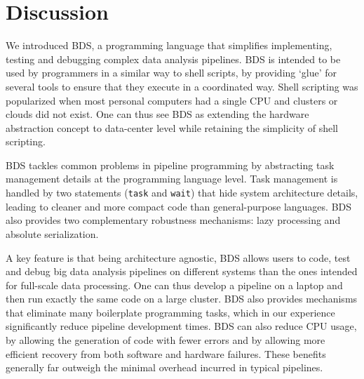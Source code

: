 \section{Discussion}

We introduced BDS, a programming language that simplifies implementing, testing and debugging complex data analysis pipelines. BDS is intended to be used by programmers in a similar way to shell scripts, by providing ‘glue’ for several tools to ensure that they execute in a coordinated way. Shell scripting was popularized when most personal computers had a single CPU and clusters or clouds did not exist. One can thus see BDS as extending the hardware abstraction concept to data-center level while retaining the simplicity of shell scripting.

BDS tackles common problems in pipeline programming by abstracting task management details at the programming language level. Task management is handled by two statements (\texttt{task} and \texttt{wait}) that hide system architecture details, leading to cleaner and more compact code than general-purpose languages. BDS also provides two complementary robustness mechanisms: lazy processing and absolute serialization.

A key feature is that being architecture agnostic, BDS allows users to code, test and debug big data analysis pipelines on different systems than the ones intended for full-scale data processing. One can thus develop a pipeline on a laptop and then run exactly the same code on a large cluster. BDS also provides mechanisms that eliminate many boilerplate programming tasks, which in our experience significantly reduce pipeline development times. BDS can also reduce CPU usage, by allowing the generation of code with fewer errors and by allowing more efficient recovery from both software and hardware failures. These benefits generally far outweigh the minimal overhead incurred in typical pipelines.

